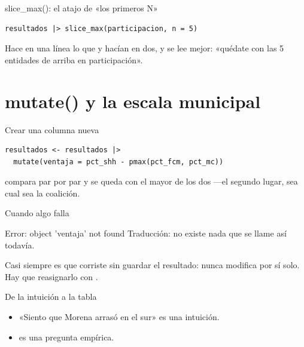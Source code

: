 \begin{frame}[fragile]{slice\_max(): el atajo de «los primeros N»}
\begin{lstlisting}
resultados |> slice_max(participacion, n = 5)
\end{lstlisting}

  \vspace{0.6em}
  Hace en una línea lo que  y  hacían en dos, y
  se lee mejor: «quédate con las 5 entidades de arriba en participación».
\end{frame}

\section{mutate() y la escala municipal}

\begin{frame}[fragile]{Crear una columna nueva}
\begin{lstlisting}
resultados <- resultados |>
  mutate(ventaja = pct_shh - pmax(pct_fcm, pct_mc))
\end{lstlisting}

  \vspace{0.6em}
   compara par por par y se queda con el mayor de los dos —el
  segundo lugar, sea cual sea la coalición.
\end{frame}

\begin{frame}{Cuando algo falla}
  \vspace{0.4em}
  \begin{errorbox}{Error: object 'ventaja' not found}
    Traducción: no existe nada que se llame así todavía.

    \vspace{0.5em}
    Casi siempre es que corriste  sin guardar el resultado:
     nunca modifica  por sí solo. Hay que
    reasignarlo con .
  \end{errorbox}
\end{frame}

\begin{frame}{De la intuición a la tabla}
  \vspace{0.3em}
  \begin{itemize}\setlength{\itemsep}{0.9em}
    \item<1-> «Siento que Morena arrasó en el sur» es una intuición.
    \item<2->  es una pregunta empírica.
  \end{itemize}

  \vspace{1.1em}
\end{frame}

